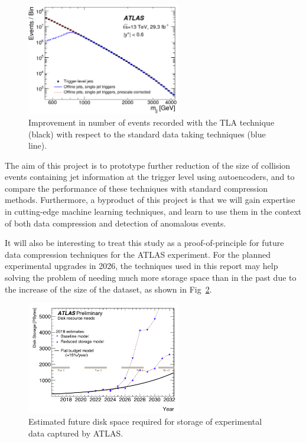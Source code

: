 \documentclass[11pt]{article}
\begin{document}
\begin{figure}[H]
\centering
\includegraphics[width=0.6\textwidth]{TLA.png}
\caption{Improvement in number of events recorded with the TLA technique (black) with respect to the standard data taking techniques (blue line).}
\label{TLA}
\end{figure}

The aim of this project is to prototype further reduction of the size of collision events containing jet information at the trigger level using autoencoders, and to compare the performance of these techniques with standard compression methods. Furthermore, a byproduct of this project is that we will gain expertise in cutting-edge machine learning techniques, and learn to use them in the context of both data compression and detection of anomalous events. 

It will also be interesting to treat this study as a proof-of-principle for future data compression techniques for the ATLAS experiment. For the planned experimental upgrades in 2026, the techniques used in this report may help solving the problem of needing much more storage space than in the past due to the increase of the size of the dataset, as shown in Fig~\ref{diskHLLHC}.

\begin{figure}[H]
\centering
\includegraphics[width=0.6\textwidth]{diskHLLHC_noold.png}
\caption{Estimated future disk space required for storage of experimental data captured by ATLAS.}
\label{diskHLLHC}
\end{figure}
\end{document}
